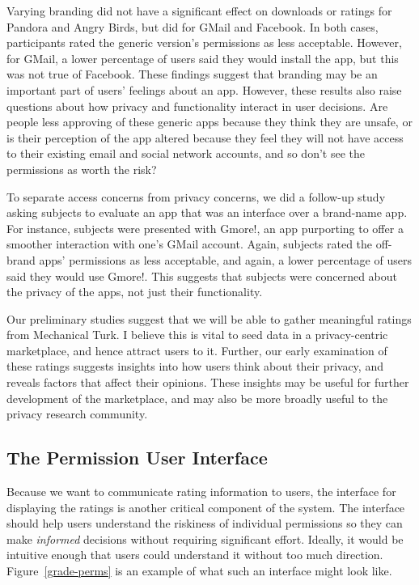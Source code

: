 \documentclass[11pt]{article}
\newcommand{\reffig}[1]{Figure~\ref{#1}}
\begin{document}
Varying branding did not have a significant effect on downloads or
ratings for Pandora and Angry Birds, but did 
for GMail and Facebook. In both cases,
participants rated the generic version's permissions as less
acceptable. However, for GMail, a lower percentage of users said they
would install the app, but this was not true of Facebook.  These
findings suggest that branding may be an important part of users'
feelings about an app. However, these results also raise questions
about how privacy and functionality interact in user decisions. Are
people less approving of these generic apps because they think they
are unsafe, or is their perception of the app altered because they 
feel they will not have access to their
existing email and social network accounts, 
and so don't see the permissions as worth the risk?

To separate access concerns from privacy concerns, we did a follow-up
study asking subjects to evaluate an app that was an
interface over a brand-name app. For instance,
subjects were presented with Gmore!, an app purporting to offer a
smoother interaction with one's GMail account. Again, subjects rated
the off-brand apps' permissions as less acceptable, and again, a lower
percentage of users said they would use Gmore!. This suggests that
subjects were concerned about the privacy of the apps, not just their
functionality.

Our preliminary studies suggest that we will be able to gather
meaningful ratings from Mechanical Turk. I believe this is vital
to seed data in a privacy-centric marketplace, and hence attract users
to it. Further, our early examination of these ratings 
suggests insights into how users think about their privacy, and reveals
factors that affect their opinions. These insights may be useful for
further development of the marketplace, and may also be more broadly
useful to the privacy research community.

\subsection{The Permission User Interface}
\label{subsec-perm-ui}

Because we want to communicate rating information to users,
the interface for displaying the ratings is another critical component of 
the system. The interface should help users understand the 
riskiness of individual permissions so they can make \emph{informed}
decisions without requiring significant
effort. Ideally, it would be 
intuitive enough that users could understand it without too 
much direction. \reffig{grade-perms} is an example of what such an interface
might look like.
\end{document}
